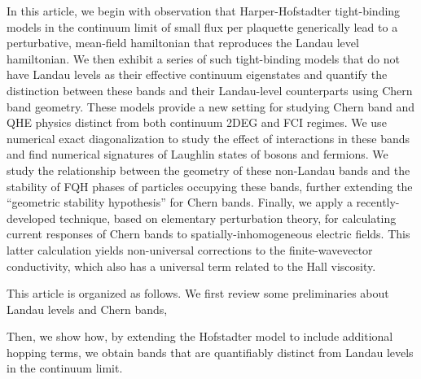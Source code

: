 \documentclass[aps,prb,twocolumn,letterpaper,twoside,nobalancelastpage,groupedaddress,amsmath,amssymb,floatfix,citeautoscript]{revtex4-1}
\begin{document}
In this article, we begin with observation that Harper-Hofstadter \cite{harper_general_1955,Azbel:1964tk,hofstadter_energy_1976} tight-binding models in the continuum limit of small flux per plaquette generically lead to a perturbative, mean-field hamiltonian that reproduces the Landau level hamiltonian. We then exhibit a series of such tight-binding models that do not have Landau levels as their effective continuum eigenstates and quantify the distinction between these bands and their Landau-level counterparts using Chern band geometry. These models provide a new setting for studying Chern band and QHE physics distinct from both continuum 2DEG and FCI regimes. We use numerical exact diagonalization to study the effect of interactions in these bands and find numerical signatures of Laughlin states of bosons and fermions. We study the relationship between the geometry of these non-Landau bands and the stability of FQH phases of particles occupying these bands, further extending the ``geometric stability hypothesis'' for Chern bands\cite{jackson_geometric_2015}. Finally, we apply a recently-developed technique, based on elementary perturbation theory\cite{harper_finite-wavevector_2018}, for calculating current responses of Chern bands to spatially-inhomogeneous electric fields. This latter calculation yields non-universal corrections to the finite-wavevector conductivity, which also has a universal term related to the Hall viscosity.

This article is organized as follows. We first review some preliminaries about Landau levels and Chern bands, 

Then, we show how, by extending the Hofstadter model to include additional hopping terms, we obtain bands that are quantifiably distinct from Landau levels in the continuum limit. 
\end{document}
